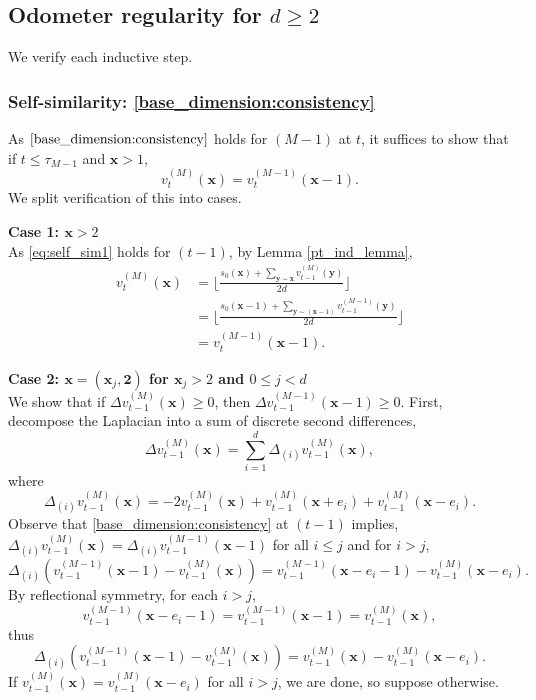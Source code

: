 \documentclass[12pt]{amsart}
\begin{document}
	


\subsection{Odometer regularity for \texorpdfstring{$d \geq 2$}{d >= 2}} \label{subsec:regularity_higher}

We verify each inductive step. 


\subsubsection*{Self-similarity: \eqref{base_dimension:consistency}} \label{subsubsec:higher_self_similarity}
As $\eqref{base_dimension:consistency}$ holds for $(M-1)$ at $t$, it suffices to show 
that if $t \leq \tau_{M-1}$ and $\mathbf{x} > 1$,
\begin{equation}\label{eq:self_sim1}
v_t^{(M)}(\mathbf{x}) = v_t^{(M-1)}(\mathbf{x}-1).
\end{equation}
We split verification of this into cases. 

{\bf Case 1: $\mathbf{x} > 2$} \\ 
As \eqref{eq:self_sim1} holds for $(t-1)$, by Lemma \ref{pt_ind_lemma}, 
\begin{align*}
v_{t}^{(M)}(\mathbf{x}) &= \lfloor \frac{ s_0(\mathbf{x}) + \sum_{\mathbf{y} \sim \mathbf{x}} v_{t-1}^{(M)}(\mathbf{y}) }{2 d} \rfloor \\
&= \lfloor \frac{ s_0(\mathbf{x}-1) + \sum_{\mathbf{y} \sim (\mathbf{x}-1)} v_{t-1}^{(M-1)}(\mathbf{y})}{2 d} \rfloor \\
&= v_t^{(M-1)}(\mathbf{x}-1).
\end{align*}

{\bf Case 2:  $\mathbf{x} = (\mathbf{x}_j, \mathbf{2})$ for $\mathbf{x}_j > 2$ and $0 \leq j < d$ } \\
We show that if $\Delta v_{t-1}^{(M)}(\mathbf{x}) \geq 0$, then  $\Delta v_{t-1}^{(M-1)}(\mathbf{x}-1) \geq 0$.
First, decompose the Laplacian into a sum of discrete second differences,
\[
\Delta v_{t-1}^{(M)}(\mathbf{x}) = \sum_{i=1}^d \Delta_{(i)} v_{t-1}^{(M)}(\mathbf{x}),
\]
where 
\[
\Delta_{(i)} v_{t-1}^{(M)}(\mathbf{x}) =  - 2 v_{t-1}^{(M)}(\mathbf{x}) + v_{t-1}^{(M)}(\mathbf{x}+e_i) + v_{t-1}^{(M)}(\mathbf{x}-e_i). 
\]
Observe that \eqref{base_dimension:consistency} at $(t-1)$ implies, 
$\Delta_{(i)} v_{t-1}^{(M)}(\mathbf{x}) = \Delta_{(i)} v_{t-1}^{(M-1)}(\mathbf{x}-1)$
for all $i \leq j$ and for $i > j$, 
\[
\Delta_{(i)} (v_{t-1}^{(M-1)}(\mathbf{x}-1) - v_{t-1}^{(M)}(\mathbf{x})) = v_{t-1}^{(M-1)}(\mathbf{x}-e_i-1) - v_{t-1}^{(M)}(\mathbf{x}-e_i).
\]
By reflectional symmetry, for each $i > j$, 
\[
v_{t-1}^{(M-1)}(\mathbf{x}-e_i-1) = v_{t-1}^{(M-1)}(\mathbf{x}-1) = v_{t-1}^{(M)}(\mathbf{x}),
\]
thus 
\begin{equation} \label{eq:difference}
\Delta_{(i)} (v_{t-1}^{(M-1)}(\mathbf{x}-1) - v_{t-1}^{(M)}(\mathbf{x}))  = v_{t-1}^{(M)}(\mathbf{x}) - v_{t-1}^{(M)}(\mathbf{x}-e_i).
\end{equation}
If $v_{t-1}^{(M)}(\mathbf{x}) = v_{t-1}^{(M)}(\mathbf{x}-e_i)$ for all $i > j$, we are done, so suppose otherwise.
\end{document}
